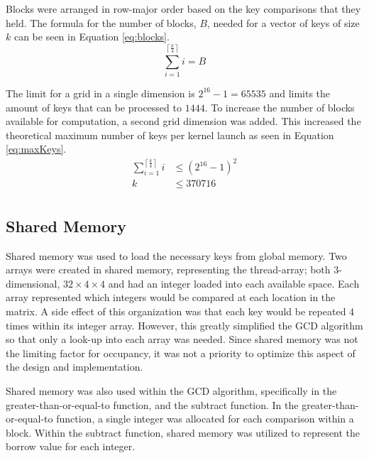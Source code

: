 \documentclass[12pt]{ucthesis}
\begin{document}
Blocks were arranged in row-major order based on the key comparisons that they 
held. The formula for the number of blocks, $B$, needed for a vector of keys of 
size $k$ can be seen in Equation \ref{eq:blocks}.
\begin{equation}
   \label{eq:blocks}
   \sum_{i=1}^{\left\lceil \frac{k}{4} \right\rceil}i = B
\end{equation}

The limit for a grid in a single dimension is $2^{16} - 1 = 65535$ 
and limits the amount of keys that can be processed to $1444$. To increase 
the number of blocks available for computation, a second grid dimension was 
added. This increased the theoretical maximum number of keys per kernel 
launch as seen in Equation \ref{eq:maxKeys}.
\begin{equation}
   \label{eq:maxKeys}
   \begin{split}
   \sum_{i = 1}^{\left\lceil\frac{k}{4}\right\rceil} i & \leq {\left(2^{16} - 
   1\right)}^2\\
   k & \leq 370716\\
   \end{split}
\end{equation}

\subsection{Shared Memory}
\label{subsec:shared}
Shared memory was used to load the necessary keys from global memory. Two 
arrays were created in shared memory, representing the thread-array; both 
3-dimensional, $32\times4\times4$ and had an integer loaded into each 
available space. Each array represented which integers would be compared at 
each location in the matrix. A side effect of this organization was that each key would be 
repeated 4 times within its integer array. However, this greatly simplified 
the GCD algorithm so that only a look-up into each array was needed. Since 
shared memory was not the limiting factor for occupancy, it was not a priority 
to optimize this aspect of the design and implementation. 

Shared memory was also used within the GCD algorithm, specifically in the 
greater-than-or-equal-to function, and the subtract function. In the 
greater-than-or-equal-to function, a single integer was allocated for each 
comparison within a block. Within the subtract function, shared memory was 
utilized to represent the borrow value for each integer. 
\end{document}
